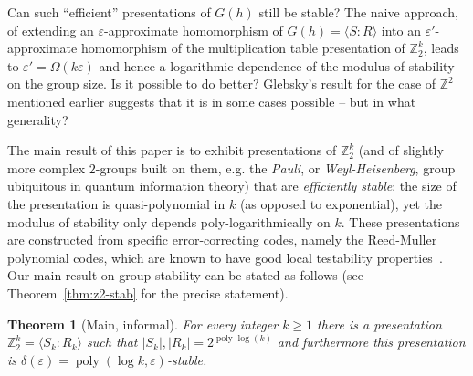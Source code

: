 \documentclass[11pt]{article}
\newtheorem{theorem*}{Theorem}
\theoremstyle{definition}
\newcommand{\Z}{\ensuremath{\mathbb{Z}}}
\DeclareMathOperator{\poly}{poly}
\newcommand{\eps}{\varepsilon}
\begin{document}

Can such ``efficient'' presentations of $G(h)$ still be stable? The naive approach, of extending an $\eps$-approximate homomorphism of $G(h)=\langle S:R\rangle$ into an $\eps'$-approximate homomorphism of the multiplication table presentation of $\Z_2^k$, leads to $\eps'=\Omega(k\eps)$ and hence a logarithmic dependence of the modulus of stability on the group size. Is it possible to do better? Glebsky's result for the case of $\Z^2$ mentioned earlier suggests that it is in some cases  possible -- but in what generality?

The main result of this paper is to exhibit presentations of $\Z_2^k$ (and of slightly more complex $2$-groups built on them, e.g. the \emph{Pauli}, or \emph{Weyl-Heisenberg}, group ubiquitous in quantum information theory) that are \emph{efficiently stable}: the size of the presentation is quasi-polynomial in $k$ (as opposed to exponential), yet the modulus of stability only depends poly-logarithmically on $k$. These presentations are constructed from specific error-correcting codes, namely the Reed-Muller polynomial codes, which are known to have good local testability properties~\cite{babai1991non}. Our main result on group stability can be stated as follows (see Theorem~\ref{thm:z2-stab} for the precise statement).

\begin{theorem*}[Main, informal]
For every integer $k\geq 1$ there is a presentation $\Z_2^k = \langle S_k:R_k\rangle$ such that $|S_k|,|R_k| = 2^{\poly\log(k)}$ and furthermore this presentation is $\delta(\eps)=\poly(\log k,\eps)$-stable.  
\end{theorem*}
\end{document}
